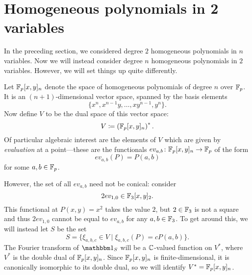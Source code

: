 \section{Homogeneous polynomials in 2 variables}\label{sec:part2}
In the preceding section, we considered degree $2$ homogeneous polynomials in $n$ variables. Now we will instead consider degree $n$ homogeneous polynomials in $2$ variables. However, we will set things up quite differently.

Let $\mathbb{F}_p[x,y]_n$ denote the space of homogeneous polynomials of degree $n$ over $\mathbb{F}_p$. It is an $(n+1)$-dimensional vector space, spanned by the basis elements
\[
	\{x^n, x^{n-1}y, \ldots, xy^{n-1}, y^n\}.
\]
Now define $V$ to be the dual space of this vector space:
\[
	V \coloneqq \left(\mathbb{F}_p[x,y]_n\right)^*.
\]
Of particular algebraic interest are the elements of $V$ which are given by \emph{evaluation} at a point---these are the functionals $ev_{a,b}\colon \mathbb{F}_p[x,y]_n \to \mathbb{F}_p$ of the form
\[
	ev_{a,b}(P) = P(a,b) 
\]
for some $a,b\in \mathbb{F}_p$.

However, the set of all $ev_{a,b}$ need not be conical: consider
\[
	2ev_{1,0} \in \mathbb{F}_3[x,y]_2.
\]
This functional at $P(x,y) = x^2$ takes the value $2$, but $2\in \mathbb{F}_3$ is not a square and thus $2ev_{1,0}$ cannot be equal to $ev_{a,b}$ for any $a,b\in \mathbb{F}_3$. To get around this, we will instead let $S$ be the set
\[
	S=\{\xi_{a,b,c} \in V \mid \xi_{a,b,c}(P) = cP(a,b)\}.
\]
The Fourier transform of $\IND_S$ will be a $\mathbb{C}$-valued function on $V^*$, where $V^*$ is the double dual of $\mathbb{F}_p[x,y]_n$. Since $\mathbb{F}_p[x,y]_n$ is finite-dimensional, it is canonically isomorphic to its double dual, so we will identify $V^* = \mathbb{F}_p[x,y]_n$.

